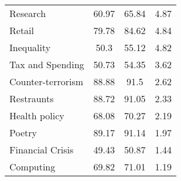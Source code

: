 \begin{table}[htbp]
\begin{tabular}{l|c|c|c|}
Research                   & 60.97                                                            & 65.84                                                        & 4.87                                                              \\
Retail                     & 79.78                                                            & 84.62                                                        & 4.84                                                             \\
Inequality                 & 50.3                                                             & 55.12                                                        & 4.82                                                              \\
Tax and Spending           & 50.73                                                            & 54.35                                                        & 3.62                                                              \\
Counter-terrorism          & 88.88                                                            & 91.5                                                         & 2.62                                                              \\
Restraunts                 & 88.72                                                            & 91.05                                                        & 2.33                                                              \\
Health policy              & 68.08                                                            & 70.27                                                        & 2.19                                                              \\
Poetry                     & 89.17                                                            & 91.14                                                        & 1.97                                                              \\
Financial Crisis           & 49.43                                                            & 50.87                                                        & 1.44                                                              \\
Computing                  & 69.82                                                            & 71.01                                                        & 1.19                                                              \\

\end{tabular}
\end{table}
